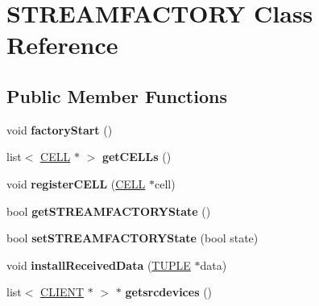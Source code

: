 \hypertarget{classSTREAMFACTORY}{}\section{S\+T\+R\+E\+A\+M\+F\+A\+C\+T\+O\+R\+Y Class Reference}
\label{classSTREAMFACTORY}
\subsection*{Public Member Functions}
\begin{DoxyCompactItemize}
\item 
\hypertarget{classSTREAMFACTORY_adb6e711f4314ea889cb77d26c1d11401}{}void {\bfseries factory\+Start} ()\label{classSTREAMFACTORY_adb6e711f4314ea889cb77d26c1d11401}

\item 
\hypertarget{classSTREAMFACTORY_a048304e01d2af328ab82a4057b3f4e6e}{}list$<$ \hyperlink{classCELL}{C\+E\+L\+L} $\ast$ $>$ {\bfseries get\+C\+E\+L\+Ls} ()\label{classSTREAMFACTORY_a048304e01d2af328ab82a4057b3f4e6e}

\item 
\hypertarget{classSTREAMFACTORY_aee1d4f9e86a437a9863a344ea2c60343}{}void {\bfseries register\+C\+E\+L\+L} (\hyperlink{classCELL}{C\+E\+L\+L} $\ast$cell)\label{classSTREAMFACTORY_aee1d4f9e86a437a9863a344ea2c60343}

\item 
\hypertarget{classSTREAMFACTORY_adebc3a141db55b66ffeebc3ee36fd50d}{}bool {\bfseries get\+S\+T\+R\+E\+A\+M\+F\+A\+C\+T\+O\+R\+Y\+State} ()\label{classSTREAMFACTORY_adebc3a141db55b66ffeebc3ee36fd50d}

\item 
\hypertarget{classSTREAMFACTORY_af3c34f23b441fd0a5715a2d3e7540aaa}{}bool {\bfseries set\+S\+T\+R\+E\+A\+M\+F\+A\+C\+T\+O\+R\+Y\+State} (bool state)\label{classSTREAMFACTORY_af3c34f23b441fd0a5715a2d3e7540aaa}

\item 
\hypertarget{classSTREAMFACTORY_a20b9cfa0733b72f5f5be02b4d3e6f599}{}void {\bfseries install\+Received\+Data} (\hyperlink{classTUPLE}{T\+U\+P\+L\+E} $\ast$data)\label{classSTREAMFACTORY_a20b9cfa0733b72f5f5be02b4d3e6f599}

\item 
\hypertarget{classSTREAMFACTORY_a5e0920b25ff163b4e4c2df71a2e4f07d}{}list$<$ \hyperlink{structCLIENT}{C\+L\+I\+E\+N\+T} $\ast$ $>$ $\ast$ {\bfseries getsrcdevices} ()\label{classSTREAMFACTORY_a5e0920b25ff163b4e4c2df71a2e4f07d}


\end{DoxyCompactItemize}
